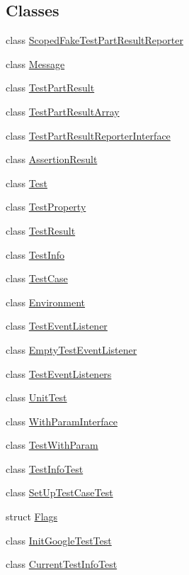 \subsection*{\-Classes}
\begin{DoxyCompactItemize}
\item 
class \hyperlink{classtesting_1_1ScopedFakeTestPartResultReporter}{\-Scoped\-Fake\-Test\-Part\-Result\-Reporter}
\item 
class \hyperlink{classtesting_1_1Message}{\-Message}
\item 
class \hyperlink{classtesting_1_1TestPartResult}{\-Test\-Part\-Result}
\item 
class \hyperlink{classtesting_1_1TestPartResultArray}{\-Test\-Part\-Result\-Array}
\item 
class \hyperlink{classtesting_1_1TestPartResultReporterInterface}{\-Test\-Part\-Result\-Reporter\-Interface}
\item 
class \hyperlink{classtesting_1_1AssertionResult}{\-Assertion\-Result}
\item 
class \hyperlink{classtesting_1_1Test}{\-Test}
\item 
class \hyperlink{classtesting_1_1TestProperty}{\-Test\-Property}
\item 
class \hyperlink{classtesting_1_1TestResult}{\-Test\-Result}
\item 
class \hyperlink{classtesting_1_1TestInfo}{\-Test\-Info}
\item 
class \hyperlink{classtesting_1_1TestCase}{\-Test\-Case}
\item 
class \hyperlink{classtesting_1_1Environment}{\-Environment}
\item 
class \hyperlink{classtesting_1_1TestEventListener}{\-Test\-Event\-Listener}
\item 
class \hyperlink{classtesting_1_1EmptyTestEventListener}{\-Empty\-Test\-Event\-Listener}
\item 
class \hyperlink{classtesting_1_1TestEventListeners}{\-Test\-Event\-Listeners}
\item 
class \hyperlink{classtesting_1_1UnitTest}{\-Unit\-Test}
\item 
class \hyperlink{classtesting_1_1WithParamInterface}{\-With\-Param\-Interface}
\item 
class \hyperlink{classtesting_1_1TestWithParam}{\-Test\-With\-Param}
\item 
class \hyperlink{classtesting_1_1TestInfoTest}{\-Test\-Info\-Test}
\item 
class \hyperlink{classtesting_1_1SetUpTestCaseTest}{\-Set\-Up\-Test\-Case\-Test}
\item 
struct \hyperlink{structtesting_1_1Flags}{\-Flags}
\item 
class \hyperlink{classtesting_1_1InitGoogleTestTest}{\-Init\-Google\-Test\-Test}
\item 
class \hyperlink{classtesting_1_1CurrentTestInfoTest}{\-Current\-Test\-Info\-Test}
\end{DoxyCompactItemize}
